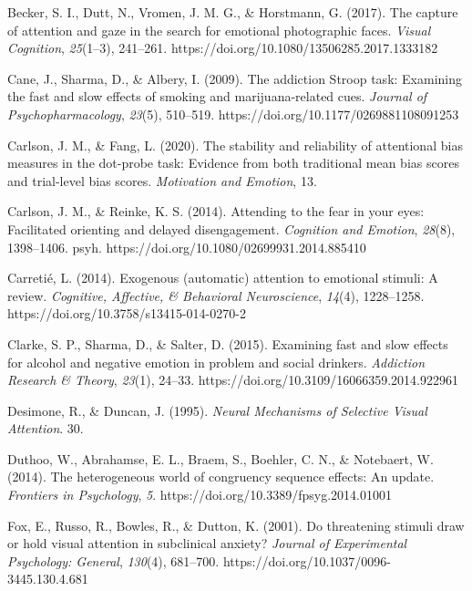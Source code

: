 \documentclass{article}
\begin{document}
	Becker, S. I., Dutt, N., Vromen, J. M. G., \& Horstmann, G. (2017). The capture of attention and gaze in the search for emotional photographic faces. \emph{Visual Cognition}, \emph{25}(1--3), 241--261. https://doi.org/10.1080/13506285.2017.1333182



	Cane, J., Sharma, D., \& Albery, I. (2009). The addiction Stroop task: Examining the fast and slow effects of smoking and marijuana-related cues. \emph{Journal of Psychopharmacology}, \emph{23}(5), 510--519. https://doi.org/10.1177/0269881108091253



	Carlson, J. M., \& Fang, L. (2020). The stability and reliability of attentional bias measures in the dot-probe task: Evidence from both traditional mean bias scores and trial-level bias scores. \emph{Motivation and Emotion}, 13.



	Carlson, J. M., \& Reinke, K. S. (2014). Attending to the fear in your eyes: Facilitated orienting and delayed disengagement. \emph{Cognition and Emotion}, \emph{28}(8), 1398--1406. psyh. https://doi.org/10.1080/02699931.2014.885410



	Carretié, L. (2014). Exogenous (automatic) attention to emotional stimuli: A review. \emph{Cognitive, Affective, \& Behavioral Neuroscience}, \emph{14}(4), 1228--1258. https://doi.org/10.3758/s13415-014-0270-2



	Clarke, S. P., Sharma, D., \& Salter, D. (2015). Examining fast and slow effects for alcohol and negative emotion in problem and social drinkers. \emph{Addiction Research \& Theory}, \emph{23}(1), 24--33. https://doi.org/10.3109/16066359.2014.922961



	Desimone, R., \& Duncan, J. (1995). \emph{Neural Mechanisms of Selective Visual Attention}. 30.



	Duthoo, W., Abrahamse, E. L., Braem, S., Boehler, C. N., \& Notebaert, W. (2014). The heterogeneous world of congruency sequence effects: An update. \emph{Frontiers in Psychology}, \emph{5}. https://doi.org/10.3389/fpsyg.2014.01001



	Fox, E., Russo, R., Bowles, R., \& Dutton, K. (2001). Do threatening stimuli draw or hold visual attention in subclinical anxiety? \emph{Journal of Experimental Psychology: General}, \emph{130}(4), 681--700. https://doi.org/10.1037/0096-3445.130.4.681
\end{document}
